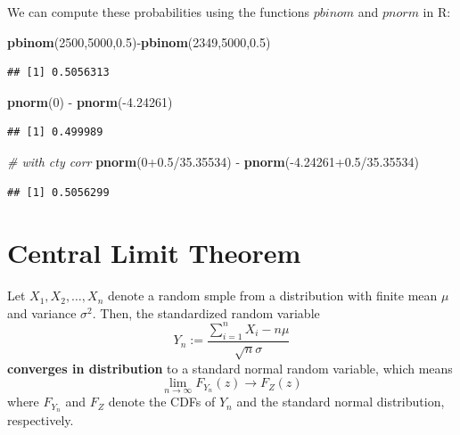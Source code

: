 \documentclass[]{book}
\newenvironment{Shaded}{\begin{snugshade}}{\end{snugshade}}
\newcommand{\KeywordTok}[1]{\textcolor[rgb]{0.13,0.29,0.53}{\textbf{{#1}}}}
\newcommand{\DecValTok}[1]{\textcolor[rgb]{0.00,0.00,0.81}{{#1}}}
\newcommand{\FloatTok}[1]{\textcolor[rgb]{0.00,0.00,0.81}{{#1}}}
\newcommand{\StringTok}[1]{\textcolor[rgb]{0.31,0.60,0.02}{{#1}}}
\newcommand{\CommentTok}[1]{\textcolor[rgb]{0.56,0.35,0.01}{\textit{{#1}}}}
\newcommand{\NormalTok}[1]{{#1}}
\begin{document}
We can compute these probabilities using the functions \(pbinom\) and
\(pnorm\) in R:

\begin{Shaded}
\begin{Highlighting}[]
\KeywordTok{pbinom}\NormalTok{(}\DecValTok{2500}\NormalTok{,}\DecValTok{5000}\NormalTok{,}\FloatTok{0.5}\NormalTok{)-}\KeywordTok{pbinom}\NormalTok{(}\DecValTok{2349}\NormalTok{,}\DecValTok{5000}\NormalTok{,}\FloatTok{0.5}\NormalTok{)}
\end{Highlighting}
\end{Shaded}

\begin{verbatim}
## [1] 0.5056313
\end{verbatim}

\begin{Shaded}
\begin{Highlighting}[]
\KeywordTok{pnorm}\NormalTok{(}\DecValTok{0}\NormalTok{) -}\StringTok{ }\KeywordTok{pnorm}\NormalTok{(-}\FloatTok{4.24261}\NormalTok{)}
\end{Highlighting}
\end{Shaded}

\begin{verbatim}
## [1] 0.499989
\end{verbatim}

\begin{Shaded}
\begin{Highlighting}[]
\CommentTok{# with cty corr}
\KeywordTok{pnorm}\NormalTok{(}\DecValTok{0}\FloatTok{+0.5}\NormalTok{/}\FloatTok{35.35534}\NormalTok{) -}\StringTok{ }\KeywordTok{pnorm}\NormalTok{(-}\FloatTok{4.24261+0.5}\NormalTok{/}\FloatTok{35.35534}\NormalTok{)}
\end{Highlighting}
\end{Shaded}

\begin{verbatim}
## [1] 0.5056299
\end{verbatim}

\chapter{Central Limit Theorem}\label{central-limit-theorem}

Let \(X_1, X_2, \ldots, X_n\) denote a random smple from a distribution
with finite mean \(\mu\) and variance \(\sigma^2\). Then, the
standardized random variable
\[Y_n := \frac{\sum_{i=1}^n X_i - n\mu}{\sqrt{n}\sigma}\]
\textbf{converges in distribution} to a standard normal random variable,
which means \[\lim_{n\rightarrow \infty}F_{Y_n}(z) \rightarrow F_Z(z)\]
where \(F_{Y_n}\) and \(F_Z\) denote the CDFs of \(Y_n\) and the
standard normal distribution, respectively.
\end{document}
